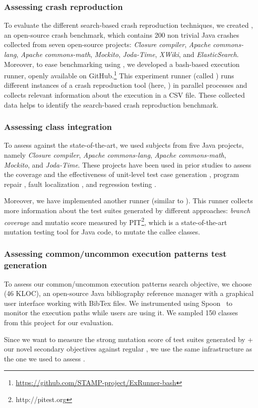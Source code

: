 \subsubsection{Assessing crash reproduction}
To evaluate the different search-based crash reproduction techniques, we created \jcrashpack, an open-source crash benchmark, which contains 200 non trivial Java crashes collected from seven open-source projects: \textit{Closure compiler}, \textit{Apache commons-lang}, \textit{Apache commons-math}, \textit{Mockito}, \textit{Joda-Time}, \textit{XWiki}, and \textit{ElasticSearch}.
Moreover, to ease benchmarking using \crashpack, we developed a bash-based execution runner, openly available on GitHub.\footnote{\url{https://github.com/STAMP-project/ExRunner-bash}} This experiment runner (called \exrunner) runs different instances of a crash reproduction tool (here, \botsing) in parallel processes and collects relevant information about the execution in a CSV file. These collected data helps to identify the search-based crash reproduction benchmark.

\subsubsection{Assessing class integration} 
To assess \cling against the state-of-the-art, we used subjects from five Java projects, namely \textit{Closure compiler}, \textit{Apache commons-lang}, \textit{Apache commons-math}, \textit{Mockito}, and \textit{Joda-Time}. These 
projects have been used in prior studies to assess the coverage and the effectiveness of unit-level test case generation \cite{ma2015grt, Panichella2018, just2014defects4j, Shamshiri2016}, program repair \cite{smith2015cure, martinez2016astor}, fault localization \cite{pearson2017evaluating, b2016learning}, and regression testing \cite{noor2015similarity, lu2016does}.

Moreover, we have implemented another runner (similar to \exrunner). This runner collects more information about the test suites generated by different approaches: \textit{branch coverage} and mutatio score measured by PIT\footnote{http://pitest.org}, which is a state-of-the-art mutation testing tool for Java code, to mutate the callee classes.

\subsubsection{Assessing common/uncommon execution patterns test generation} 

To assess our common/uncommon execution patterns search objective, we choose \jabref (46 KLOC), an open-source Java bibliography reference manager with a graphical user interface working with BibTex files. We instrumented \jabref using Spoon~\cite{pawlak:hal-01169705} to monitor the execution paths while users are using it. We sampled 150 classes from this project for our evaluation.

Since we want to measure the strong mutation score of test suites generated by \evosuite + our novel secondary objectives against regular \evosuite, we use the same infrastructure as the one we used to assess \cling.
